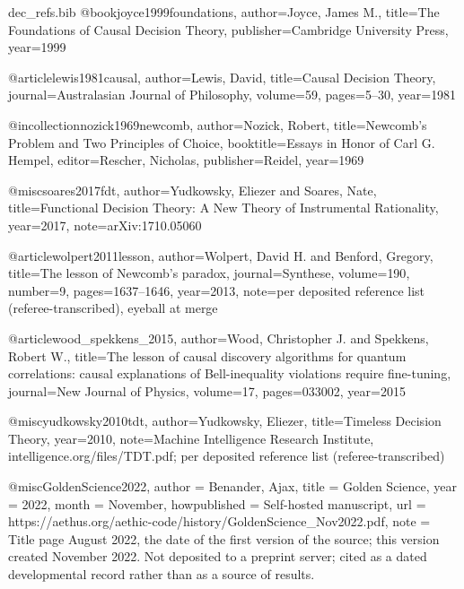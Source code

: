 \begin{filecontents}[overwrite]{dec_refs.bib}
@book{joyce1999foundations, author={Joyce, James M.}, title={The Foundations of Causal Decision Theory}, publisher={Cambridge University Press}, year={1999}}

@article{lewis1981causal, author={Lewis, David}, title={Causal Decision Theory}, journal={Australasian Journal of Philosophy}, volume={59}, pages={5--30}, year={1981}}

@incollection{nozick1969newcomb, author={Nozick, Robert}, title={Newcomb's Problem and Two Principles of Choice}, booktitle={Essays in Honor of Carl G. Hempel}, editor={Rescher, Nicholas}, publisher={Reidel}, year={1969}}

@misc{soares2017fdt, author={Yudkowsky, Eliezer and Soares, Nate}, title={Functional Decision Theory: A New Theory of Instrumental Rationality}, year={2017}, note={arXiv:1710.05060}}

@article{wolpert2011lesson, author={Wolpert, David H. and Benford, Gregory}, title={The lesson of Newcomb's paradox}, journal={Synthese}, volume={190}, number={9}, pages={1637--1646}, year={2013}, note={per deposited reference list (referee-transcribed), eyeball at merge}}

@article{wood_spekkens_2015, author={Wood, Christopher J. and Spekkens, Robert W.}, title={The lesson of causal discovery algorithms for quantum correlations: causal explanations of Bell-inequality violations require fine-tuning}, journal={New Journal of Physics}, volume={17}, pages={033002}, year={2015}}

@misc{yudkowsky2010tdt, author={Yudkowsky, Eliezer}, title={Timeless Decision Theory}, year={2010}, note={Machine Intelligence Research Institute, intelligence.org/files/TDT.pdf; per deposited reference list (referee-transcribed)}}

@misc{GoldenScience2022,
  author       = {Benander, Ajax},
  title        = {Golden Science},
  year         = {2022},
  month        = {November},
  howpublished = {Self-hosted manuscript},
  url          = {https://aethus.org/aethic-code/history/GoldenScience_Nov2022.pdf},
  note         = {Title page August 2022, the date of the first version of the source; this version created November 2022. Not deposited to a
                  preprint server; cited as a dated developmental record rather than
                  as a source of results.}
}
\end{filecontents}

